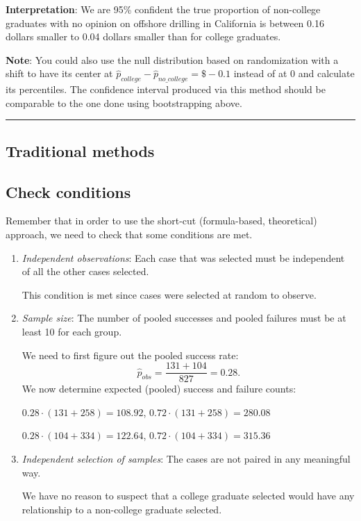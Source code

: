 \documentclass[]{tufte-book}
\let\oldrule=\rule
\renewcommand{\rule}[1]{\oldrule{\linewidth}}
\begin{document}
\textbf{Interpretation}: We are 95\% confident the true proportion of
non-college graduates with no opinion on offshore drilling in California
is between 0.16 dollars smaller to 0.04 dollars smaller than for college
graduates.

\textbf{Note}: You could also use the null distribution based on
randomization with a shift to have its center at
\(\hat{p}_{college} - \hat{p}_{no\_college} = \$-0.1\) instead of at 0
and calculate its percentiles. The confidence interval produced via this
method should be comparable to the one done using bootstrapping above.

\begin{center}\rule{0.5\linewidth}{\linethickness}\end{center}

\subsection{Traditional methods}\label{traditional-methods-2}

\subsection{Check conditions}\label{check-conditions-2}

Remember that in order to use the short-cut (formula-based, theoretical)
approach, we need to check that some conditions are met.

\begin{enumerate}
\def\labelenumi{\arabic{enumi}.}
\item
  \emph{Independent observations}: Each case that was selected must be
  independent of all the other cases selected.

  This condition is met since cases were selected at random to observe.
\item
  \emph{Sample size}: The number of pooled successes and pooled failures
  must be at least 10 for each group.

  We need to first figure out the pooled success rate:
  \[\hat{p}_{obs} = \dfrac{131 + 104}{827} = 0.28.\] We now determine
  expected (pooled) success and failure counts:

  \(0.28 \cdot (131 + 258) = 108.92\),
  \(0.72 \cdot (131 + 258) = 280.08\)

  \(0.28 \cdot (104 + 334) = 122.64\),
  \(0.72 \cdot (104 + 334) = 315.36\)
\item
  \emph{Independent selection of samples}: The cases are not paired in
  any meaningful way.

  We have no reason to suspect that a college graduate selected would
  have any relationship to a non-college graduate selected.
\end{enumerate}
\end{document}
